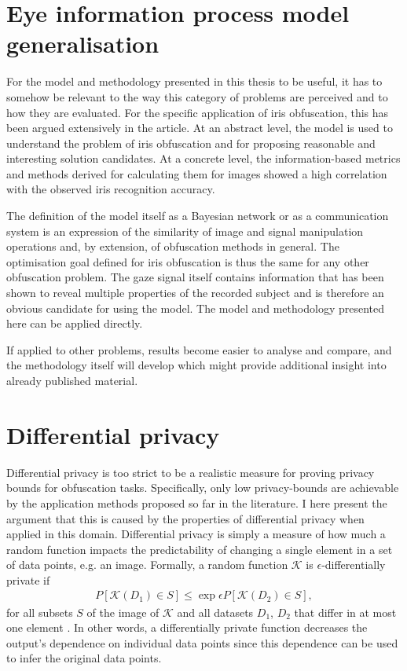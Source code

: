 
\section{Eye information process model generalisation}
For the model and methodology presented in this thesis to be useful, it has to somehow be relevant to the way this category of problems are perceived and to how they are evaluated. For the specific application of iris obfuscation, this has been argued extensively in the article. At an abstract level, the model is used to understand the problem of iris obfuscation and for proposing reasonable and interesting solution candidates. At a concrete level, the information-based metrics and methods derived for calculating them for images showed a high correlation with the observed iris recognition accuracy.

The definition of the model itself as a Bayesian network or as a communication system is an expression of the similarity of image and signal manipulation operations and, by extension, of obfuscation methods in general. The optimisation goal defined for iris obfuscation is thus the same for any other obfuscation problem. The gaze signal itself contains information that has been shown to reveal multiple properties of the recorded subject and is therefore an obvious candidate for using the model. The model and methodology presented here can be applied directly. 

If applied to other problems, results become easier to analyse and compare, and the methodology itself will develop which might provide additional insight into already published material. 

\section{Differential privacy}
Differential privacy is too strict to be a realistic measure for proving privacy bounds for obfuscation tasks. Specifically, only low privacy-bounds are achievable by the application methods proposed so far in the literature. I here present the argument that this is caused by the properties of differential privacy when applied in this domain. Differential privacy is simply a measure of how much a random function impacts the predictability of changing a single element in a set of data points, e.g. an image. Formally, a random function $\mathcal{K}$ is $\epsilon$-differentially private if
\begin{align}
	P[\mathcal{K}(D_1)\in S] \leq \exp{\epsilon} P[\mathcal{K}(D_2)\in S],
\end{align}
for all subsets $S$ of the image of $\mathcal{K}$ and all datasets $D_1$, $D_2$ that differ in at most one element \parencite{dwork2006differential}. In other words, a differentially private function decreases the output's dependence on individual data points since this dependence can be used to infer the original data points.

